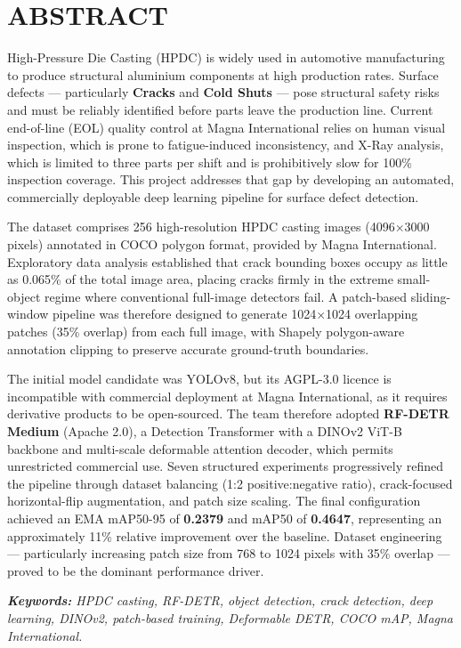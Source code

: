 \chapter*{ABSTRACT}%
\begin{justify}

High-Pressure Die Casting (HPDC) is widely used in automotive manufacturing to produce structural aluminium components at high production rates. Surface defects --- particularly \textbf{Cracks} and \textbf{Cold Shuts} --- pose structural safety risks and must be reliably identified before parts leave the production line. Current end-of-line (EOL) quality control at Magna International relies on human visual inspection, which is prone to fatigue-induced inconsistency, and X-Ray analysis, which is limited to three parts per shift and is prohibitively slow for 100\% inspection coverage. This project addresses that gap by developing an automated, commercially deployable deep learning pipeline for surface defect detection.

The dataset comprises 256 high-resolution HPDC casting images (4096$\times$3000 pixels) annotated in COCO polygon format, provided by Magna International. Exploratory data analysis established that crack bounding boxes occupy as little as 0.065\% of the total image area, placing cracks firmly in the extreme small-object regime where conventional full-image detectors fail. A patch-based sliding-window pipeline was therefore designed to generate 1024$\times$1024 overlapping patches (35\% overlap) from each full image, with Shapely polygon-aware annotation clipping to preserve accurate ground-truth boundaries.

The initial model candidate was YOLOv8, but its AGPL-3.0 licence is incompatible with commercial deployment at Magna International, as it requires derivative products to be open-sourced. The team therefore adopted \textbf{RF-DETR Medium} (Apache 2.0), a Detection Transformer with a DINOv2 ViT-B backbone and multi-scale deformable attention decoder, which permits unrestricted commercial use. Seven structured experiments progressively refined the pipeline through dataset balancing (1:2 positive:negative ratio), crack-focused horizontal-flip augmentation, and patch size scaling. The final configuration achieved an EMA mAP50-95 of \textbf{0.2379} and mAP50 of \textbf{0.4647}, representing an approximately 11\% relative improvement over the baseline. Dataset engineering --- particularly increasing patch size from 768 to 1024 pixels with 35\% overlap --- proved to be the dominant performance driver.

\end{justify}

\begin{flushleft}
\vspace{1cm}
\textsl{\textbf{Keywords:} HPDC casting, RF-DETR, object detection, crack detection, deep learning, DINOv2, patch-based training, Deformable DETR, COCO mAP, Magna International.}
\end{flushleft}

